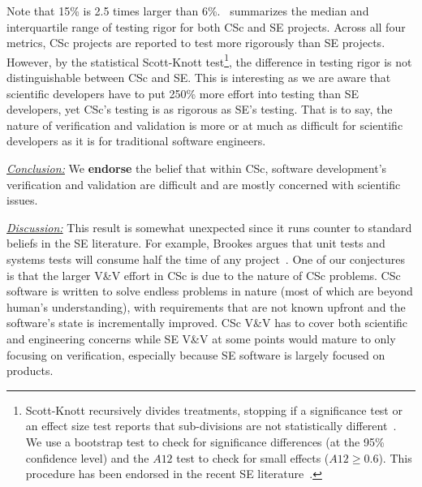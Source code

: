 \documentclass[conference,10pt]{IEEEtran}
\newcommand{\bi}{\begin{itemize}}
\newenvironment{RQ}{\vspace{1mm}\begin{tcolorbox}[enhanced,width=3.4in,size=fbox,colback=red!5!white,drop shadow southeast,sharp corners]}{\end{tcolorbox}}
\begin{document}
Note that 15\% is 2.5 times larger than 6\%.~ summarizes the median and interquartile range of testing rigor for both CSc and SE projects. Across all four metrics, CSc projects are reported to test more rigorously than SE projects. However, by the statistical Scott-Knott test\footnote{
Scott-Knott recursively divides treatments, stopping if
a significance test or an effect size test reports that sub-divisions are
not statistically different~\cite{mittas2013ranking, ghotra15}.
We use a bootstrap test to check for significance differences (at the 95\% confidence level) 
and the $\mathit{A12}$ test to check for small effects ($\mathit{A12}\ge0.6$).
This procedure has been endorsed in the recent SE literature~\cite{mittas2013ranking,arcuri2011practical}.}, the difference in testing rigor is not distinguishable between CSc and SE. 
This is interesting as we are aware that scientific  developers have to put 250\%  more effort into testing than SE developers, yet CSc's testing is as rigorous as SE's testing. That is to say, the nature of verification and validation is more or at much as difficult for scientific developers as it is for traditional software engineers.

\begin{RQ}
\textit{\underline{Conclusion:}}
We \textbf{endorse} the belief that within CSc, software development's verification and validation are difficult and are mostly concerned with scientific issues.
\end{RQ} 


\noindent\textit{\underline{Discussion:}} This result is somewhat unexpected since it runs counter to standard beliefs in the SE literature. For example, Brookes argues that unit tests and systems tests will consume half the time of any project~\cite{brooks1995mythical}. One of our conjectures is that the larger V\&V effort in CSc is due to the nature of CSc problems. CSc software is written to solve endless problems in nature  (most of which are beyond human's understanding), with  requirements that are not known upfront and the software's state is incrementally improved. CSc V\&V has to cover both scientific and engineering concerns while SE V\&V at some points would mature to only focusing on verification, especially because SE software is largely focused on products. 
\end{document}
